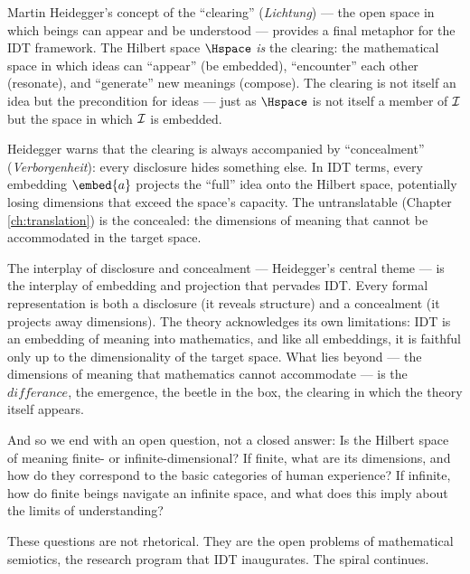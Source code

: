 \begin{interpretation}
\label{interp:ch22:heidegger_clearing}
Martin Heidegger's concept of the ``clearing'' (\textit{Lichtung}) ---
the open space in which beings can appear and be understood --- provides
a final metaphor for the IDT framework.  The Hilbert space $\Hspace$
\emph{is} the clearing: the mathematical space in which ideas can
``appear'' (be embedded), ``encounter'' each other (resonate), and
``generate'' new meanings (compose).  The clearing is not itself an
idea but the precondition for ideas --- just as $\Hspace$ is not
itself a member of $\mathcal{I}$ but the space in which $\mathcal{I}$ is embedded.

Heidegger warns that the clearing is always accompanied by
``concealment'' (\textit{Verborgenheit}): every disclosure hides
something else.  In IDT terms, every embedding $\embed{a}$ projects
the ``full'' idea onto the Hilbert space, potentially losing dimensions
that exceed the space's capacity.  The untranslatable (Chapter~%
\ref{ch:translation}) is the concealed: the dimensions of meaning
that cannot be accommodated in the target space.

The interplay of disclosure and concealment --- Heidegger's central
theme --- is the interplay of embedding and projection that pervades
IDT.  Every formal representation is both a disclosure (it reveals
structure) and a concealment (it projects away dimensions).  The
theory acknowledges its own limitations: IDT is an embedding of
meaning into mathematics, and like all embeddings, it is faithful
only up to the dimensionality of the target space.  What lies beyond
--- the dimensions of meaning that mathematics cannot accommodate ---
is the $diff\acute{e}rance$, the emergence, the beetle in the box,
the clearing in which the theory itself appears.

And so we end with an open question, not a closed answer: Is the
Hilbert space of meaning finite- or infinite-dimensional?  If finite,
what are its dimensions, and how do they correspond to the basic
categories of human experience?  If infinite, how do finite beings
navigate an infinite space, and what does this imply about the limits
of understanding?

These questions are not rhetorical.  They are the open problems of
mathematical semiotics, the research program that IDT inaugurates.
The spiral continues.
\end{interpretation}


